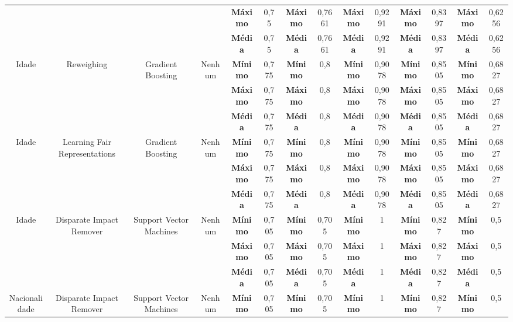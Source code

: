 \documentclass[portugues]{ic-tese}
\begin{document}
\begin{table}[H]
\begin{center}
{\begin{tabular}{c|c|c|c|c|c|c|c|c|c|c|c|c|c}
             & & & & \textbf{Máximo} & 0,75 & \textbf{Máximo} & 0,7661 & \textbf{Máximo} & 0,9291 & \textbf{Máximo} & 0,8397 & \textbf{Máximo} & 0,6256 \\
             & & & & \textbf{Média} & 0,75 & \textbf{Média} & 0,7661 & \textbf{Média} & 0,9291 & \textbf{Média} & 0,8397 & \textbf{Média} & 0,6256 \\
            \hline
            \multirow{3}{*}{Idade} & \multirow{3}{*}{Reweighing} & \multirow{3}{*}{Gradient Boosting} & \multirow{3}{*}{Nenhum} & \textbf{Mínimo} & 0,775 & \textbf{Mínimo} & 0,8 & \textbf{Mínimo} & 0,9078 & \textbf{Mínimo} & 0,8505 & \textbf{Mínimo} & 0,6827 \\
             & & & & \textbf{Máximo} & 0,775 & \textbf{Máximo} & 0,8 & \textbf{Máximo} & 0,9078 & \textbf{Máximo} & 0,8505 & \textbf{Máximo} & 0,6827 \\
             & & & & \textbf{Média} & 0,775 & \textbf{Média} & 0,8 & \textbf{Média} & 0,9078 & \textbf{Média} & 0,8505 & \textbf{Média} & 0,6827 \\
            \hline
            \multirow{3}{*}{Idade} & \multirow{3}{*}{Learning Fair Representations} & \multirow{3}{*}{Gradient Boosting} & \multirow{3}{*}{Nenhum} & \textbf{Mínimo} & 0,775 & \textbf{Mínimo} & 0,8 & \textbf{Mínimo} & 0,9078 & \textbf{Mínimo} & 0,8505 & \textbf{Mínimo} & 0,6827 \\
             & & & & \textbf{Máximo} & 0,775 & \textbf{Máximo} & 0,8 & \textbf{Máximo} & 0,9078 & \textbf{Máximo} & 0,8505 & \textbf{Máximo} & 0,6827 \\
             & & & & \textbf{Média} & 0,775 & \textbf{Média} & 0,8 & \textbf{Média} & 0,9078 & \textbf{Média} & 0,8505 & \textbf{Média} & 0,6827 \\
            \hline
            \multirow{3}{*}{Idade} & \multirow{3}{*}{Disparate Impact Remover} & \multirow{3}{*}{Support Vector Machines} & \multirow{3}{*}{Nenhum} & \textbf{Mínimo} & 0,705 & \textbf{Mínimo} & 0,705 & \textbf{Mínimo} & 1 & \textbf{Mínimo} & 0,827 & \textbf{Mínimo} & 0,5 \\
             & & & & \textbf{Máximo} & 0,705 & \textbf{Máximo} & 0,705 & \textbf{Máximo} & 1 & \textbf{Máximo} & 0,827 & \textbf{Máximo} & 0,5 \\
             & & & & \textbf{Média} & 0,705 & \textbf{Média} & 0,705 & \textbf{Média} & 1 & \textbf{Média} & 0,827 & \textbf{Média} & 0,5 \\
            \hline
            \multirow{3}{*}{Nacionalidade} & \multirow{3}{*}{Disparate Impact Remover} & \multirow{3}{*}{Support Vector Machines} & \multirow{3}{*}{Nenhum} & \textbf{Mínimo} & 0,705 & \textbf{Mínimo} & 0,705 & \textbf{Mínimo} & 1 & \textbf{Mínimo} & 0,827 & \textbf{Mínimo} & 0,5 \\

\end{tabular}}
\end{center}
\end{table}
\end{document}

